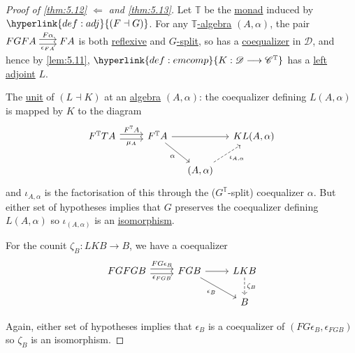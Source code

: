 \documentclass{article}
\newenvironment{tikzcdi}{\begin{tikzcd}[cramped, sep=scriptsize]}{\end{tikzcd}}
\let\to\longrightarrow
\begin{document}
\begin{proof}[Proof of \cref{thm:5.12} $\Leftarrow$ and \cref{thm:5.13}]
  Let $\mathbb{T}$ be the \hyperlink{def:monad}{monad} induced by $\hyperlink{def:adj}{(F \dashv G)}$.
  For any \hyperlink{def:em}{$\mathbb{T}$-algebra} $(A, \alpha)$, the pair
  $
  \begin{tikzcdi}
    FGFA \rar[shift left]{F\alpha} \rar[shift right,']{\epsilon_{FA}} & FA
  \end{tikzcdi}
  $
  is both \hyperlink{def:reflexive}{reflexive} and \hyperlink{def:gsplit}{$G$-split}, so has a \hyperlink{def:equalizer}{coequalizer} in $\mathscr{D}$, and hence by \cref{lem:5.11}, $\hyperlink{def:emcomp}{K: \mathscr{D} \to \mathscr{C}^\mathbb{T}}$ has a \hyperlink{def:adj}{left adjoint} $L$.

  The \hyperlink{def:unit}{unit} of $(L \dashv K)$ at an \hyperlink{def:em}{algebra} $(A, \alpha)$: the coequalizer defining $L(A, \alpha)$ is mapped by $K$ to the diagram
  \begin{equation*}
    \begin{tikzcd}[column sep=small]
    F^\mathbb{T}TA \arrow[shift left,"F^\mathbb{T} A", rr] \arrow[rr, shift right, "\mu_A"'] && F^\mathbb{T} A \arrow[rr] \drar[']{\alpha} && KL(A,\alpha) \\
                                                                                               &&&(A,\alpha) \arrow[ur, "\iota_{A,\alpha}"', dashed]
    \end{tikzcd}
  \end{equation*}
  and $\iota_{A,\alpha}$ is the factorisation of this through the ($G^\mathbb{T}$-split) coequalizer $\alpha$.
  But either set of hypotheses implies that $G$ preserves the coequalizer defining $L(A,\alpha)$ so $\iota_{(A,\alpha)}$ is an \hyperlink{def:iso}{isomorphism}.

  For the counit $\zeta_B: LKB \to B$, we have a coequalizer
  \begin{equation*}
  \begin{tikzcd}
    FGFGB \rar[shift left]{FG\epsilon_B} \rar[shift right,']{\epsilon_{FGB}} & FGB \rar \drar[']{\epsilon_B} & LKB \dar[dashed]{\zeta_B} \\ &&B
  \end{tikzcd}
  \end{equation*}

  Again, either set of hypotheses implies that $\epsilon_B$ is a coequalizer of $(FG\epsilon_B, \epsilon_{FGB})$ so $\zeta_B$ is an isomorphism.
\end{proof}
\end{document}
